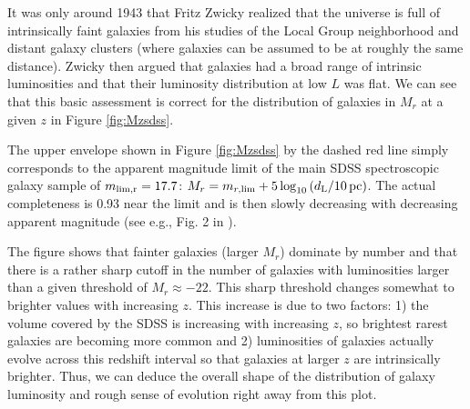 It was only around 1943 that Fritz Zwicky realized that the universe is full of intrinsically faint galaxies from his studies of the Local Group neighborhood and distant galaxy clusters (where galaxies can be assumed to be at roughly the same distance). Zwicky then argued that galaxies had a broad range of intrinsic luminosities and that their luminosity distribution at low $L$ was flat. We can see that this basic assessment is correct for the distribution of galaxies in $M_r$ at a given $z$ in Figure \ref{fig:Mzsdss}.

The upper envelope shown in Figure \ref{fig:Mzsdss} by the dashed red line simply corresponds to the apparent magnitude limit of the main SDSS spectroscopic galaxy sample of $m_{\rm lim, r}=17.7$:
$M_{r}= m_{r,\rm lim}+5\log_{10}\left(d_{\rm L}/10\,\mathrm{pc}\right)$. The actual completeness is 0.93 near the limit and is then slowly decreasing with decreasing apparent magnitude (see e.g., Fig. 2 in \href{http://adsabs.harvard.edu/abs/2009MNRAS.399.1106M}{\citealt{montero_dorta_prada09}}).

The figure shows that fainter galaxies (larger $M_r$) dominate by number and that there is a rather sharp cutoff in the number of galaxies with luminosities larger than a given threshold of $M_{r}\approx -22$. This sharp threshold changes somewhat to brighter values with increasing $z$. This increase is due to two factors: 1) the volume covered by the SDSS is increasing with increasing $z$, so brightest rarest galaxies are becoming more common and 2) luminosities of galaxies actually evolve across this redshift interval so that galaxies at larger $z$ are intrinsically brighter. Thus, we can deduce the overall shape of the distribution of galaxy luminosity and rough sense of evolution right away from this plot. 


